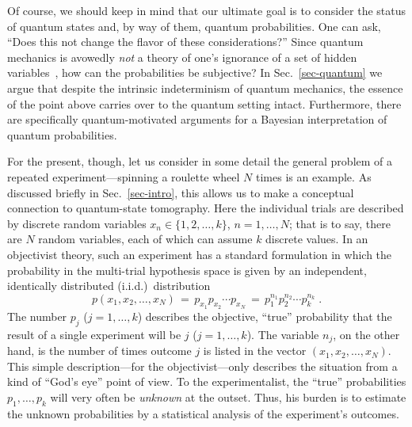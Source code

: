 \documentclass[12pt,aps,eqsecnum]{revtex4-1}
\begin{document}
Of course, we should keep in mind that our ultimate goal is to
consider the status of quantum states and, by way of them, quantum
probabilities. One can ask, ``Does this not change the flavor of
these considerations?'' Since quantum mechanics is avowedly {\it
not\/} a theory of one's ignorance of a set of hidden
variables~\cite{BellBook,GoldsteinBook}, how can the probabilities
be subjective?  In Sec.~\ref{sec-quantum} we argue that despite
the intrinsic indeterminism of quantum mechanics, the essence of
the point above carries over to the quantum setting intact.
Furthermore, there are specifically quantum-motivated arguments
for a Bayesian interpretation of quantum probabilities.

For the present, though, let us consider in some detail the
general problem of a repeated experiment---spinning a roulette
wheel $N$ times is an example. As discussed briefly in
Sec.~\ref{sec-intro}, this allows us to make a conceptual
connection to quantum-state tomography.  Here the individual
trials are described by discrete random variables
$x_n\in\{1,2,\ldots,k\}$, $n=1,\ldots,N$; that is to say, there
are $N$ random variables, each of which can assume $k$ discrete
values. In an objectivist theory, such an experiment has a
standard formulation in which the probability in the multi-trial
hypothesis space is given by an independent, identically
distributed (i.i.d.)\ distribution
\begin{equation}
p(x_1,x_2,\ldots,x_N)\,=\,p_{x_1} p_{x_2} \cdots p_{x_N}\, =\,
p_1^{n_{\scriptscriptstyle 1}} p_2^{n_{\scriptscriptstyle 2}}\cdots
p_k^{n_{\scriptscriptstyle k}}\;.
\label{eq-iid}
\end{equation}
The number $p_j$ ($j=1,\ldots,k$) describes the objective,
``true'' probability that the result of a single experiment will
be $j$ ($j=1,\ldots,k$).  The variable $n_j$, on the other hand,
is the number of times outcome $j$ is listed in the vector
$(x_1,x_2,\ldots,x_N)$.  This simple description---for the
objectivist---only describes the situation from a kind of ``God's
eye'' point of view.  To the experimentalist, the ``true''
probabilities $p_1,\ldots,p_k$ will very often be {\it unknown\/}
at the outset.  Thus, his burden is to estimate the unknown
probabilities by a statistical analysis of the experiment's
outcomes.
\end{document}
